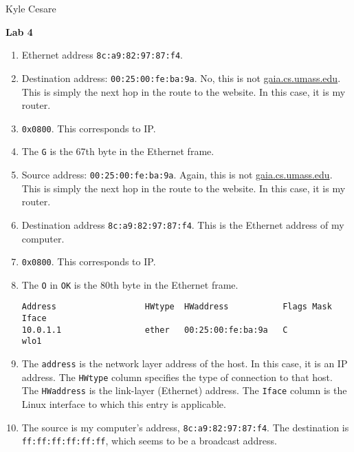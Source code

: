 \documentclass[11pt]{article}
\begin{document}
\begin{flushright}
  Kyle Cesare
\end{flushright}

{\center \textbf{Lab 4} \\}

\begin{enumerate}
  \item Ethernet address \texttt{8c:a9:82:97:87:f4}.

  \item Destination address: \texttt{00:25:00:fe:ba:9a}.  No, this is not
    \url{gaia.cs.umass.edu}.  This is simply the next hop in the route to the
    website.  In this case, it is my router.

  \item \texttt{0x0800}.  This corresponds to IP.

  \item The \texttt{G} is the 67th byte in the Ethernet frame.

  \item Source address: \texttt{00:25:00:fe:ba:9a}.  Again, this is not
    \url{gaia.cs.umass.edu}.  This is simply the next hop in the route to the
    website.  In this case, it is my router.

  \item Destination address \texttt{8c:a9:82:97:87:f4}.  This is the Ethernet
    address of my computer.

  \item \texttt{0x0800}.  This corresponds to IP.

  \item The \texttt{O} in \texttt{OK} is the 80th byte in the Ethernet frame.

{\tiny
\begin{verbatim}
Address                  HWtype  HWaddress           Flags Mask            Iface
10.0.1.1                 ether   00:25:00:fe:ba:9a   C                     wlo1
\end{verbatim}
}

  \item The \texttt{address} is the network layer address of the host.  In this
    case, it is an IP address.  The \texttt{HWtype} column specifies the type of
    connection to that host.  The \texttt{HWaddress} is the link-layer
    (Ethernet) address.  The \texttt{Iface} column is the Linux interface to
    which this entry is applicable.

  \item The source is my computer's address, \texttt{8c:a9:82:97:87:f4}.  The
    destination is \texttt{ff:ff:ff:ff:ff:ff}, which seems to be a broadcast
    address.


\end{enumerate}
\end{document}
